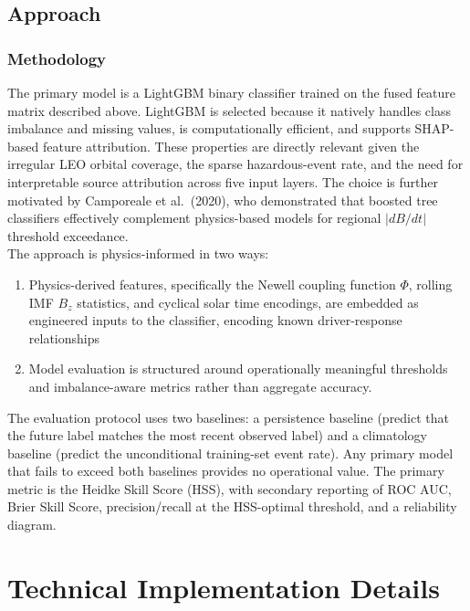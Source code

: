 \documentclass{article}
\begin{document}
\subsection*{Approach}

\subsubsection*{Methodology}
The primary model is a LightGBM binary classifier trained on the fused feature matrix described above. LightGBM is selected because it natively handles class imbalance and missing values, is computationally efficient, and supports SHAP-based feature attribution. These properties are directly relevant given the irregular LEO orbital coverage, the sparse hazardous-event rate, and the need for interpretable source attribution across five input layers. The choice is further motivated by Camporeale et al.\ (2020), who demonstrated that boosted tree classifiers effectively complement physics-based models for regional $|dB/dt|$ threshold exceedance.\\

\noindent The approach is physics-informed in two ways: \\
\begin{enumerate}
  \item Physics-derived features, specifically the Newell coupling function $\Phi$, rolling IMF $B_z$ statistics, and cyclical solar time encodings, are embedded as engineered inputs to the classifier, encoding known driver-response relationships
  \item Model evaluation is structured around operationally meaningful thresholds and imbalance-aware metrics rather than aggregate accuracy.
\end{enumerate}

\noindent The evaluation protocol uses two baselines: a persistence baseline (predict that the future label matches the most recent observed label) and a climatology baseline (predict the unconditional training-set event rate). Any primary model that fails to exceed both baselines provides no operational value. The primary metric is the Heidke Skill Score (HSS), with secondary reporting of ROC AUC, Brier Skill Score, precision/recall at the HSS-optimal threshold, and a reliability diagram.

\section*{Technical Implementation Details}
\end{document}
